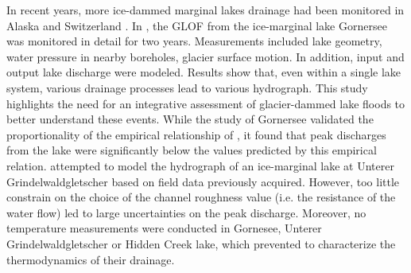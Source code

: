 In recent years, more ice-dammed marginal lakes drainage had been monitored in Alaska \citep[Hidden Creek Lake, ][]{Anderson&al2003,Anderson&al2005,Walder&al2005,Walder&al2006} and Switzerland \citep{Huss&al2007, Werder&al2010}. In \cite{Huss&al2007}, the GLOF from the ice-marginal lake Gornersee was monitored in detail for two years. Measurements included lake geometry, water pressure in nearby boreholes, glacier surface motion. In addition, input and output lake discharge were modeled. Results show that, even within a single lake system, various drainage processes lead to various hydrograph. This study highlights the need for an integrative assessment of glacier-dammed lake floods to better understand these events. While the study of Gornersee validated the proportionality of the empirical relationship of \cite{Clague&Mathews1973}, it found that peak discharges from the lake were significantly below the values predicted by this empirical relation. \cite{Werder&al2010} attempted to model the hydrograph of an ice-marginal lake at Unterer Grindelwaldgletscher based on field data previously acquired. However, too little constrain on the choice of the channel roughness value (i.e. the resistance of the water flow) led to large uncertainties on the peak discharge. Moreover, no temperature measurements were conducted in Gornesee, Unterer Grindelwaldgletscher or Hidden Creek lake, which prevented to characterize the thermodynamics of their drainage.








